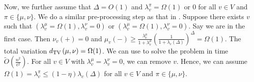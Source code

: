     Now, we further assume that $\Delta = O(1)$ and $\lambda^\pi_v = \Omega(1)$ or $0$ for all $v\in V$ and $\pi \in \{\mu,\nu\}$.
    We do a similar pre-processing step as that in .
    Suppose there exists $v$ such that $(\lambda^\mu_v = \Omega(1),\lambda^\nu_v = 0)$ or $(\lambda^\mu_v = \Omega(1),\lambda^\nu_v = 0)$. Say we are in the first case. Then $\nu_v(+) = 0$ and $\mu_v(-) \geq \frac{\lambda^\mu_v}{1+\lambda^\mu_v}(\frac{1}{1+\lambda_c(\Delta)})^\Delta = \Omega(1)$. The total variation $d_{\mathrm{TV}}\left({\mu},{\nu}\right)=\Omega(1)$. We can use  to solve the problem in time $\tilde{O}(\frac{n^2}{\epsilon^2})$. For all $v \in V$ with $\lambda^\mu_v = \lambda^\nu_v=0$, we can remove $v$. Hence, we can assume $\Omega(1)=\lambda^\pi_v \leq (1 - \eta)\lambda_c(\Delta)$ for all $v \in V$ and $\pi \in \{\mu,\nu\}$.
    
